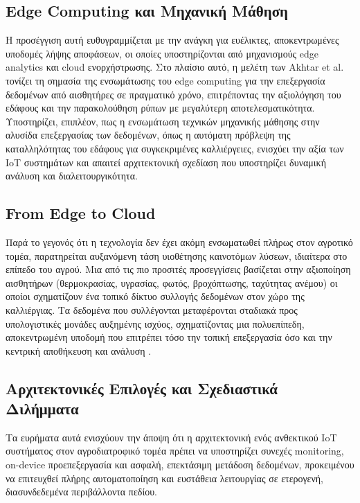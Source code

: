 \subsection{Edge Computing και Μηχανική Μάθηση}

Η προσέγγιση αυτή ευθυγραμμίζεται με την ανάγκη για ευέλικτες, αποκεντρωμένες υποδομές λήψης αποφάσεων, οι οποίες υποστηρίζονται από μηχανισμούς edge analytics και cloud ενορχήστρωσης. Στο πλαίσιο αυτό, η μελέτη των Akhtar et al. \cite{edgeagriculture} τονίζει τη σημασία της ενσωμάτωσης του edge computing για την επεξεργασία δεδομένων από αισθητήρες σε πραγματικό χρόνο, επιτρέποντας την αξιολόγηση του εδάφους και την παρακολούθηση ρύπων με μεγαλύτερη αποτελεσματικότητα. Υποστηρίζει, επιπλέον, πως η ενσωμάτωση τεχνικών μηχανικής μάθησης στην αλυσίδα επεξεργασίας των δεδομένων, όπως η αυτόματη πρόβλεψη της καταλληλότητας του εδάφους για συγκεκριμένες καλλιέργειες, ενισχύει την αξία των IoT συστημάτων και απαιτεί αρχιτεκτονική σχεδίαση που υποστηρίζει δυναμική ανάλυση και διαλειτουργικότητα.

\subsection{From Edge to Cloud}

Παρά το γεγονός ότι η τεχνολογία δεν έχει ακόμη ενσωματωθεί πλήρως στον αγροτικό τομέα, παρατηρείται αυξανόμενη τάση υιοθέτησης καινοτόμων λύσεων, ιδιαίτερα στο επίπεδο του αγρού. Μια από τις πιο προσιτές προσεγγίσεις βασίζεται στην αξιοποίηση αισθητήρων (θερμοκρασίας, υγρασίας, φωτός, βροχόπτωσης, ταχύτητας ανέμου) οι οποίοι σχηματίζουν ένα τοπικό δίκτυο συλλογής δεδομένων στον χώρο της καλλιέργιας. Τα δεδομένα που συλλέγονται μεταφέρονται σταδιακά προς υπολογιστικές μονάδες αυξημένης ισχύος, σχηματίζοντας μια πολυεπίπεδη, αποκεντρωμένη υποδομή που επιτρέπει τόσο την τοπική επεξεργασία όσο και την κεντρική αποθήκευση και ανάλυση \cite{iotmonitorcontrol}.

\subsection{Αρχιτεκτονικές Επιλογές και Σχεδιαστικά Διλήμματα}

Τα ευρήματα αυτά ενισχύουν την άποψη ότι η αρχιτεκτονική ενός ανθεκτικού IoT συστήματος στον αγροδιατροφικό τομέα πρέπει να υποστηρίζει συνεχές monitoring, on-device προεπεξεργασία και ασφαλή, επεκτάσιμη μετάδοση δεδομένων, προκειμένου να επιτευχθεί πλήρης αυτοματοποίηση και ευστάθεια λειτουργίας σε ετερογενή, διασυνδεδεμένα περιβάλλοντα πεδίου.

